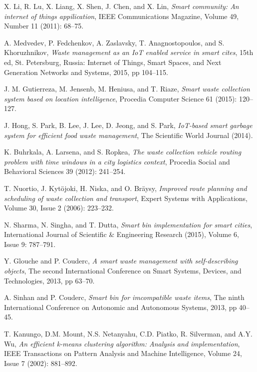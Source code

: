 \documentclass[conference]{IEEEtran}
\begin{document}
\begin{thebibliography}{1}
X. Li, R. Lu, X. Liang, X. Shen, J. Chen, and X. Lin, \emph{Smart community: An internet of things appilication}, IEEE Communications Magazine, Volume 49, Number 11 (2011): 68--75.

A. Medvedev, P. Fedchenkov, A. Zaslavsky, T. Anagnostopoulos, and S. Khoruzhnikov, \emph{Waste management as an IoT enabled service in smart cites}, 15th ed, St. Petersburg, Russia: Internet of Things, Smart Spaces, and Next Generation Networks and Systems, 2015, pp 104--115.



J. M. Gutierreza, M. Jensenb, M. Heniusa, and T. Riaze, \emph{Smart waste collection system based on location intelligence}, Procedia Computer Science 61 (2015): 120--127.


J. Hong, S. Park, B. Lee, J. Lee, D. Jeong, and S. Park, \emph{IoT-based smart garbage system for efficient food waste management}, The Scientific World Journal (2014).




K. Buhrkala, A. Larsena, and S. Ropkea, \emph{The waste collection vehicle routing problem with time windows in a city logistics context}, Procedia Social and Behavioral Sciences 39 (2012): 241--254.


T. Nuortio, J. Kyt\"ojoki, H. Niska, and O. Br\"aysy, \emph{Improved route planning and scheduling of waste collection and transport}, Expert Systems with Applications, Volume 30, Issue 2 (2006): 223--232.


N. Sharma, N. Singha, and T. Dutta, \emph{Smart bin implementation for smart cities}, International Journal of Scientific \& Engineering Research (2015), Volume 6, Issue 9: 787--791.


Y. Glouche and P. Couderc, \emph{A smart waste management with self-describing objects}, The second International Conference on Smart Systems, Devices, and Technologies, 2013, pp 63--70.


A. Sinhan and P. Couderc, \emph{Smart bin for imcompatible waste items}, The ninth International Conference on Autonomic and Autonomous Systems, 2013, pp 40--45.


T. Kanungo, D.M. Mount, N.S. Netanyahu, C.D. Piatko, R. Silverman, and A.Y. Wu, \emph{An efficient k-means clustering algorithm: Analysis and implementation}, IEEE Transactions on Pattern Analysis and Machine Intelligence, Volume 24, Issue 7 (2002): 881--892.



\end{thebibliography}
\end{document}

